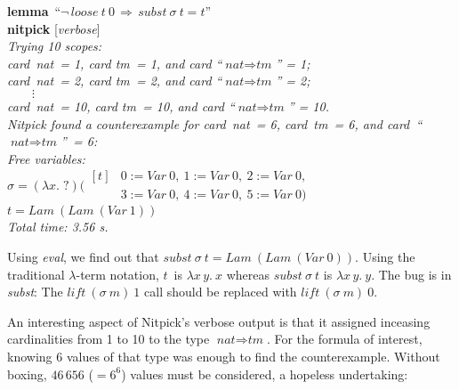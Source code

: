 \documentclass[a4paper,12pt]{article}
\def\unk{{?}}
\def\undef{(\lambda x.\; \unk)}
\begin{document}
\pre
\textbf{lemma}~``$\lnot\,\textit{loose}~t~0 \,\Longrightarrow\, \textit{subst}~\sigma~t = t$'' \\
\textbf{nitpick} [\textit{verbose}] \\[2\smallskipamount]
\slshape
Trying 10 scopes: \nopagebreak \\
\hbox{}\qquad \textit{card~nat}~= 1, \textit{card tm}~= 1, and \textit{card} ``$\textit{nat} \Rightarrow \textit{tm}$'' = 1; \\
\hbox{}\qquad \textit{card~nat}~= 2, \textit{card tm}~= 2, and \textit{card} ``$\textit{nat} \Rightarrow \textit{tm}$'' = 2; \\
\hbox{}\qquad $\qquad\vdots$ \\[.5\smallskipamount]
\hbox{}\qquad \textit{card~nat}~= 10, \textit{card tm}~= 10, and \textit{card} ``$\textit{nat} \Rightarrow \textit{tm}$'' = 10. \\[2\smallskipamount]
Nitpick found a counterexample for \textit{card~nat}~= 6, \textit{card~tm}~= 6,
and \textit{card}~``$\textit{nat} \Rightarrow \textit{tm}$''~= 6: \\[2\smallskipamount]
\hbox{}\qquad Free variables: \nopagebreak \\
\hbox{}\qquad\qquad $\sigma = \undef(\!\begin{aligned}[t]
& 0 := \textit{Var}~0,\>
  1 := \textit{Var}~0,\>
  2 := \textit{Var}~0, \\[-2pt]
& 3 := \textit{Var}~0,\>
  4 := \textit{Var}~0,\>
  5 := \textit{Var}~0)\end{aligned}$ \\
\hbox{}\qquad\qquad $t = \textit{Lam}~(\textit{Lam}~(\textit{Var}~1))$ \\[2\smallskipamount]
Total time: 3.56 s.
\postw

Using \textit{eval}, we find out that $\textit{subst}~\sigma~t =
\textit{Lam}~(\textit{Lam}~(\textit{Var}~0))$. Using the traditional
$\lambda$-term notation, $t$~is
$\lambda x\, y.\> x$ whereas $\textit{subst}~\sigma~t$ is $\lambda x\, y.\> y$.
The bug is in \textit{subst\/}: The $\textit{lift}~(\sigma~m)~1$ call should be
replaced with $\textit{lift}~(\sigma~m)~0$.

An interesting aspect of Nitpick's verbose output is that it assigned inceasing
cardinalities from 1 to 10 to the type $\textit{nat} \Rightarrow \textit{tm}$.
For the formula of interest, knowing 6 values of that type was enough to find
the counterexample. Without boxing, $46\,656$ ($= 6^6$) values must be
considered, a hopeless undertaking:
\end{document}
